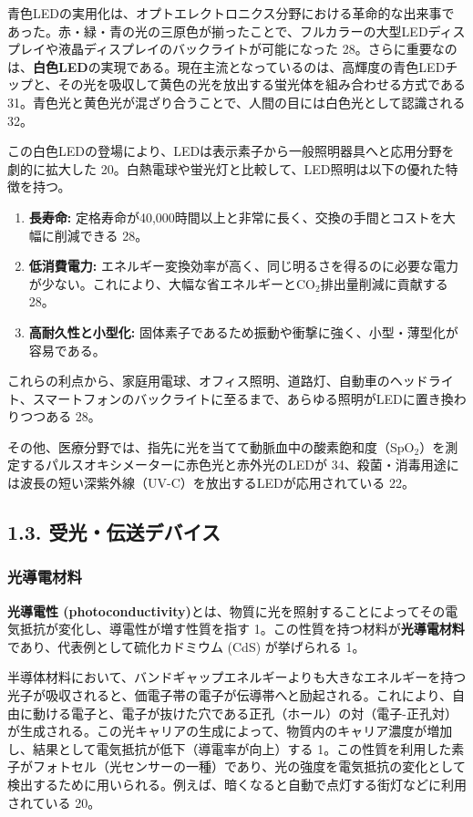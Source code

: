 \documentclass[11pt,a4paper]{ltjsarticle}
\begin{document}
青色LEDの実用化は、オプトエレクトロニクス分野における革命的な出来事であった。赤・緑・青の光の三原色が揃ったことで、フルカラーの大型LEDディスプレイや液晶ディスプレイのバックライトが可能になった 28。さらに重要なのは、\textbf{白色LED}の実現である。現在主流となっているのは、高輝度の青色LEDチップと、その光を吸収して黄色の光を放出する蛍光体を組み合わせる方式である 31。青色光と黄色光が混ざり合うことで、人間の目には白色光として認識される 32。

この白色LEDの登場により、LEDは表示素子から一般照明器具へと応用分野を劇的に拡大した 20。白熱電球や蛍光灯と比較して、LED照明は以下の優れた特徴を持つ。

\begin{enumerate}
\item \textbf{長寿命:} 定格寿命が40,000時間以上と非常に長く、交換の手間とコストを大幅に削減できる 28。
\item \textbf{低消費電力:} エネルギー変換効率が高く、同じ明るさを得るのに必要な電力が少ない。これにより、大幅な省エネルギーとCO$_2$排出量削減に貢献する 28。
\item \textbf{高耐久性と小型化:} 固体素子であるため振動や衝撃に強く、小型・薄型化が容易である。
\end{enumerate}

これらの利点から、家庭用電球、オフィス照明、道路灯、自動車のヘッドライト、スマートフォンのバックライトに至るまで、あらゆる照明がLEDに置き換わりつつある 28。

その他、医療分野では、指先に光を当てて動脈血中の酸素飽和度（SpO$_2$）を測定するパルスオキシメーターに赤色光と赤外光のLEDが 34、殺菌・消毒用途には波長の短い深紫外線（UV-C）を放出するLEDが応用されている 22。

\subsection*{1.3. 受光・伝送デバイス}

\subsubsection*{光導電材料}

\textbf{光導電性 (photoconductivity)}とは、物質に光を照射することによってその電気抵抗が変化し、導電性が増す性質を指す 1。この性質を持つ材料が\textbf{光導電材料}であり、代表例として硫化カドミウム (CdS) が挙げられる 1。

半導体材料において、バンドギャップエネルギーよりも大きなエネルギーを持つ光子が吸収されると、価電子帯の電子が伝導帯へと励起される。これにより、自由に動ける電子と、電子が抜けた穴である正孔（ホール）の対（電子-正孔対）が生成される。この光キャリアの生成によって、物質内のキャリア濃度が増加し、結果として電気抵抗が低下（導電率が向上）する 1。この性質を利用した素子がフォトセル（光センサーの一種）であり、光の強度を電気抵抗の変化として検出するために用いられる。例えば、暗くなると自動で点灯する街灯などに利用されている 20。
\end{document}
